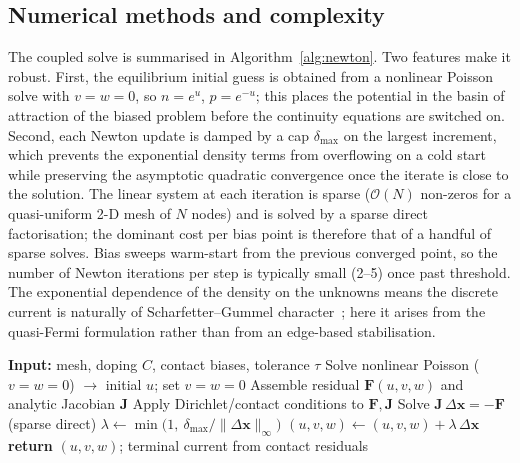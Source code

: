 \documentclass[10pt,journal]{IEEEtran}
\begin{document}
\subsection{Numerical methods and complexity}
\label{sec:numerics}
The coupled solve is summarised in Algorithm~\ref{alg:newton}. Two features make
it robust. First, the equilibrium initial guess is obtained from a nonlinear
Poisson solve with $v=w=0$, so $n=e^{u}$, $p=e^{-u}$; this places the potential
in the basin of attraction of the biased problem before the continuity equations
are switched on. Second, each Newton update is damped by a cap $\delta_{\max}$ on
the largest increment, which prevents the exponential density terms from
overflowing on a cold start while preserving the asymptotic quadratic
convergence once the iterate is close to the solution. The linear system at each
iteration is sparse ($\mathcal{O}(N)$ non-zeros for a quasi-uniform 2-D mesh of
$N$ nodes) and is solved by a sparse direct factorisation; the dominant cost per
bias point is therefore that of a handful of sparse solves. Bias sweeps
warm-start from the previous converged point, so the number of Newton iterations
per step is typically small (2--5) once past threshold. The exponential
dependence of the density on the unknowns means the discrete current is naturally
of Scharfetter--Gummel character~\cite{scharfetter1969}; here it arises from the
quasi-Fermi formulation rather than from an edge-based stabilisation.

\begin{algorithm}[t]
\caption{Coupled drift-diffusion solve at one bias point}
\label{alg:newton}
\begin{algorithmic}[1]
\State \textbf{Input:} mesh, doping $C$, contact biases, tolerance $\tau$
\State Solve nonlinear Poisson ($v=w=0$) $\to$ initial $u$; set $v=w=0$
\Repeat
  \State Assemble residual $\mathbf{F}(u,v,w)$ and analytic Jacobian $\mathbf{J}$
  \State Apply Dirichlet/contact conditions to $\mathbf{F},\mathbf{J}$
  \State Solve $\mathbf{J}\,\Delta\mathbf{x}=-\mathbf{F}$ (sparse direct)
  \State $\lambda \gets \min\!\big(1,\ \delta_{\max}/\|\Delta\mathbf{x}\|_\infty\big)$
  \State $(u,v,w) \gets (u,v,w) + \lambda\,\Delta\mathbf{x}$
\State \textbf{return} $(u,v,w)$; terminal current from contact residuals
\end{algorithmic}
\end{algorithm}
\end{document}
